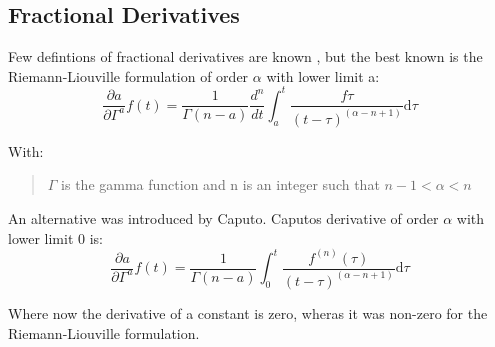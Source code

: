 \documentclass[letterpaper,titlepage,10pt]{article}
\begin{document}
\subsection{Fractional Derivatives}
Few defintions of fractional derivatives are known \cite{a}, but the best known is the Riemann-Liouville formulation of order $\alpha$ with lower limit a:
\begin{equation}
	\frac{\partial a}{\partial \Gamma^{a}}f(t) = \frac{1}{\Gamma (n-a)}\frac{d^{n}}{dt}\int_{a}^{t} \frac{f\tau}{(t-\tau)^{(\alpha -n+1)}} \text{d}\tau \label{clever}
\end{equation}
{\parindent0pt
With:
\begin{flushleft}
\begin{verse}
$\Gamma$ is the gamma function and n is an integer such that $n-1 < \alpha < n$\\
\end{verse}
\end{flushleft}

An alternative was introduced by Caputo. Caputos derivative of order $\alpha$ with lower limit 0 is:
\begin{equation}
	\frac{\partial a}{\partial \Gamma^{a}}f(t) = \frac{1}{\Gamma (n-a)}\int_{0}^{t} \frac{f^{(n)}(\tau)}{(t-\tau)^{(\alpha -n+1)}} \text{d}\tau \label{clever2}
\end{equation}

Where now the derivative of a constant is zero, wheras it was non-zero for the Riemann-Liouville formulation. 
}
\end{document}
